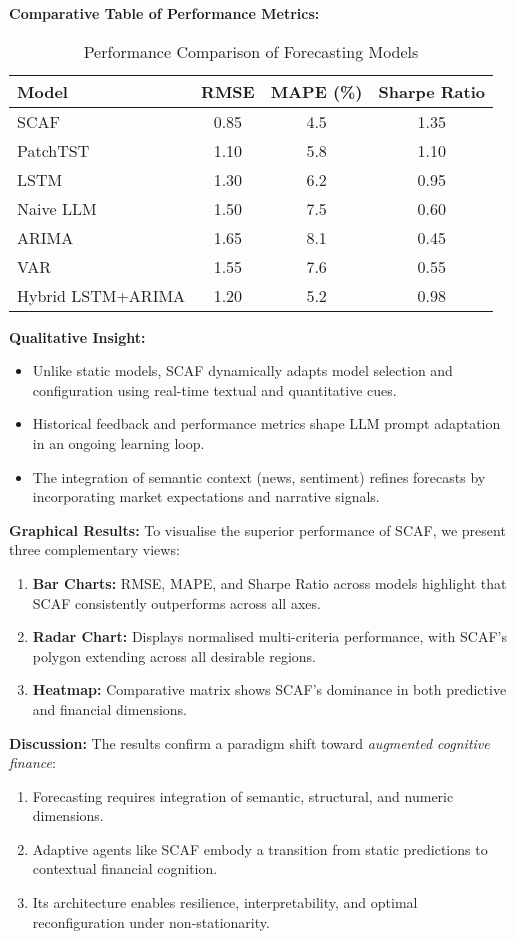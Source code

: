 \documentclass[conference]{IEEEtran}
\begin{document}
\textbf{Comparative Table of Performance Metrics:}
\begin{table}[h]
\centering
\begin{tabular}{|l|c|c|c|}
\hline
\textbf{Model} & \textbf{RMSE} & \textbf{MAPE (\%)} & \textbf{Sharpe Ratio} \\
\hline
SCAF & 0.85 & 4.5 & 1.35 \\
PatchTST & 1.10 & 5.8 & 1.10 \\
LSTM & 1.30 & 6.2 & 0.95 \\
Naive LLM & 1.50 & 7.5 & 0.60 \\
ARIMA & 1.65 & 8.1 & 0.45 \\
VAR & 1.55 & 7.6 & 0.55 \\
Hybrid LSTM+ARIMA & 1.20 & 5.2 & 0.98 \\
\hline
\end{tabular}
\caption{Performance Comparison of Forecasting Models}
\end{table}

\textbf{Qualitative Insight:}
\begin{itemize}
    \item Unlike static models, SCAF dynamically adapts model selection and configuration using real-time textual and quantitative cues.
    \item Historical feedback and performance metrics shape LLM prompt adaptation in an ongoing learning loop.
    \item The integration of semantic context (news, sentiment) refines forecasts by incorporating market expectations and narrative signals.
\end{itemize}

\textbf{Graphical Results:}
To visualise the superior performance of SCAF, we present three complementary views:
\begin{enumerate}
    \item \textbf{Bar Charts:} RMSE, MAPE, and Sharpe Ratio across models highlight that SCAF consistently outperforms across all axes.
    \item \textbf{Radar Chart:} Displays normalised multi-criteria performance, with SCAF's polygon extending across all desirable regions.
    \item \textbf{Heatmap:} Comparative matrix shows SCAF’s dominance in both predictive and financial dimensions.
\end{enumerate}

\textbf{Discussion:}
The results confirm a paradigm shift toward \emph{augmented cognitive finance}:
\begin{enumerate}
    \item Forecasting requires integration of semantic, structural, and numeric dimensions.
    \item Adaptive agents like SCAF embody a transition from static predictions to contextual financial cognition.
    \item Its architecture enables resilience, interpretability, and optimal reconfiguration under non-stationarity.
\end{enumerate}
\end{document}

